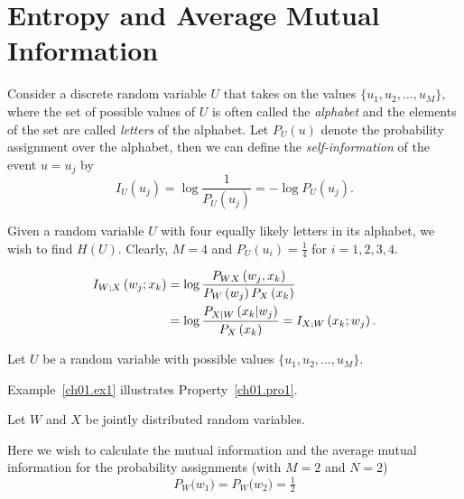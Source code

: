 \documentclass{book}\usepackage[]{graphicx}\usepackage[]{color}
\begin{document}
\section{Entropy and Average Mutual Information}
\label{ch01.sec2}

Consider a discrete random variable $U$ that takes on
the values $\{u_1, u_2, \dots, u_M\}$, where the set of possible
values of $U$ is often called the \textit{alphabet} and the elements
of the set are called \textit{letters} of the alphabet. Let $P_U(u)$
denote the probability  assignment  over the alphabet, then we can
define the \textit{self-information} of the event $ u = u_j $ by
\begin{equation}
  I_U \left( u_j \right) = \log \frac{1}{P_U (u_j)} = - \log P_U
    \left( u_j \right).
\label{ch01.eq1}
\end{equation}

\begin{example}
\label{ch01.ex1}
Given a random variable $U$ with four equally likely letters
in its alphabet, we wish to find $H(U)$. Clearly, $M=4$
and $P_U(u_i)= \tfrac{1}{4}$ for $ i = 1, 2, 3, 4 $.

\begin{align}
    I_{W;X}\left(w_j;x_k\right)
    & = \log
    \frac{P_{WX}\left(w_j, x_k\right)}{P_W\left(w_j\right)
              P_X\left(x_k\right)}
    \notag\\
    & = \log
    \frac{P_{X|W} \left( x_k | w_j\right)} {P_X \left(x_k\right)}
    =
     I_{X;W} \left(x_k; w_j\right).
\label{ch01.eq2}
\end{align}
\end{example}

\begin{property}
\label{ch01.pro1}
Let $U$ be a random variable with possible values $\{u_1,u_2,\dots, u_M\}$.
\end{property}

Example~\ref{ch01.ex1} illustrates Property~\ref{ch01.pro1}.

\begin{property}
\label{ch01.pro2}
Let $W$ and $X$ be jointly distributed random variables.
\end{property}

\begin{example}
\label{ch01.ex2}
Here we wish to calculate the mutual information and the average
mutual information for the probability assignments
(with $M=2$ and $N=2$)
\begin{equation}
 P_W \big(w_1\big) = P_W \big(w_2\big) = \tfrac{1}{2}
\label{ch01.eq3}
\end{equation}
\end{example}
\end{document}
